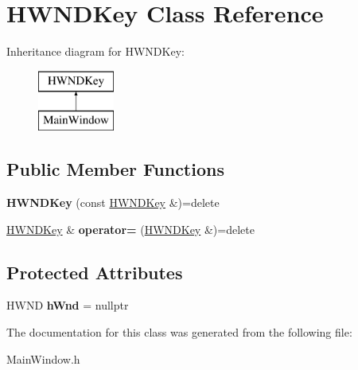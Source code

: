 \hypertarget{class_h_w_n_d_key}{}\section{H\+W\+N\+D\+Key Class Reference}
\label{class_h_w_n_d_key}
Inheritance diagram for H\+W\+N\+D\+Key\+:\begin{figure}[H]
\begin{center}
\leavevmode
\includegraphics[height=2.000000cm]{class_h_w_n_d_key}
\end{center}
\end{figure}
\subsection*{Public Member Functions}
\begin{DoxyCompactItemize}
\item 
\mbox{\label{class_h_w_n_d_key_a94e2616263522920ea59b83ed36ba0de}} 
{\bfseries H\+W\+N\+D\+Key} (const \hyperlink{class_h_w_n_d_key}{H\+W\+N\+D\+Key} \&)=delete
\item 
\mbox{\label{class_h_w_n_d_key_ab145120aa1c19dba3685d435f8089f1d}} 
\hyperlink{class_h_w_n_d_key}{H\+W\+N\+D\+Key} \& {\bfseries operator=} (\hyperlink{class_h_w_n_d_key}{H\+W\+N\+D\+Key} \&)=delete
\end{DoxyCompactItemize}
\subsection*{Protected Attributes}
\begin{DoxyCompactItemize}
\item 
\mbox{\label{class_h_w_n_d_key_a2aab5b9ab222eff9d92bf647fdae6bb3}} 
H\+W\+ND {\bfseries h\+Wnd} = nullptr
\end{DoxyCompactItemize}


The documentation for this class was generated from the following file\+:\begin{DoxyCompactItemize}
\item 
Main\+Window.\+h\end{DoxyCompactItemize}
